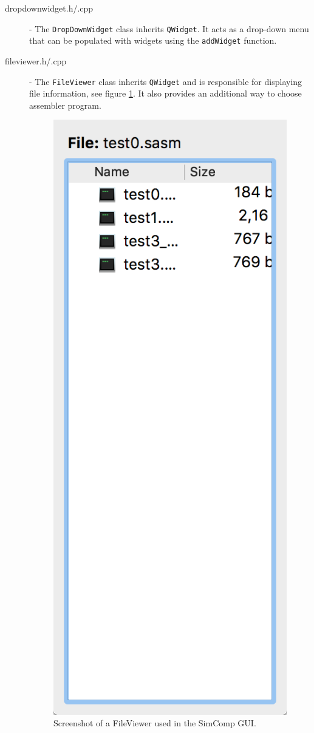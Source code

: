\begin{description}
\item [dropdownwidget.h/.cpp] - The \texttt{DropDownWidget} class inherits \texttt{QWidget}. It acts as a drop-down menu that can be populated with widgets using the \texttt{addWidget} function.

\item [fileviewer.h/.cpp] - The \texttt{FileViewer} class inherits \texttt{QWidget} and is responsible for displaying file information, see figure \ref{fig:fileviewer}. It also provides an additional way to choose assembler program. 

\begin{figure}[H]
\centering
\includegraphics[scale=0.3]{img/FileViewer.png}
\caption{Screenshot of a FileViewer used in the SimComp GUI.}
\label{fig:fileviewer}
\end{figure}


\end{description}
